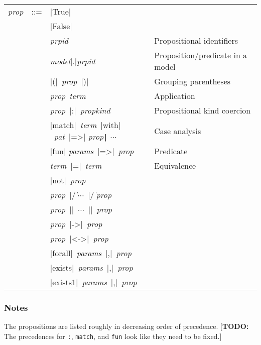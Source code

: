\documentclass[11pt]{article}
\newcommand{\metav}[1]{\mbox{\textit{#1}}}
\newcommand{\PId}{\metav{prpid}}
\newcommand{\Propexp}{\metav{prop}}
\newcommand{\Termexp}{\metav{term}}
\newcommand{\Modelexp}{\metav{model}}
\newcommand{\Propkind}{\metav{propkind}}
\newcommand{\Params}{\metav{params}}
\newcommand{\Pat}{\metav{pat}}
\newcommand{\TODO}[1]{[\textbf{TODO: }#1]}
\begin{document}
\begin{center}
	\begin{tabular}{rRlE}
	 \Propexp & ::= & |True|&\label{gr:p:true}\\
	   & \mid & |False|&\label{gr:p:false} \\
	   & \mid & \PId&Propositional identifiers\label{gr:p:id}\\
	   & \mid & \Modelexp|.|\PId&Proposition/predicate in a model\label{gr:p:mproj}\\
	   & \mid & |(|\ \Propexp\ |)|&Grouping parentheses\label{gr:p:parens}\\
	   & \mid & \Propexp\ \Termexp&Application\label{gr:p:app}\\
	   & \mid & \Propexp\ |:|\ \Propkind&Propositional kind coercion\label{gr:p:coerce}\\  
	   & \mid & |match|\ \Termexp\ |with|\ \Pat\ |=>| \Propexp \Verb+|+ $\cdots$&Case analysis\label{gr:p:match}\\
	   & \mid & |fun| \Params\ |=>|\ \Propexp&Predicate\label{gr:p:lambda}\\
	   & \mid & \Termexp\ |=|\ \Termexp&Equivalence\label{gr:p:eq}\\
	   & \mid & |not|\ \Propexp&\label{gr:p:not}\\
	   & \mid & \Propexp\ |/\|\ $\cdots$\ |/\|\ \Propexp&\label{gr:p:and}\\
	   & \mid & \Propexp\ |\/|\ $\cdots$\ |\/|\ \Propexp&\label{gr:p:or}\\
	   & \mid & \Propexp\ |->|\ \Propexp&\label{gr:p:imply}\\
	   & \mid & \Propexp\ |<->|\ \Propexp&\label{gr:p:iff}\\
	   & \mid & |forall|\ \Params\ |,|\ \Propexp&\label{gr:p:all}\\
	   & \mid & |exists|\ \Params\ |,|\ \Propexp&\label{gr:p:some}\\
	   & \mid & |exists1|\ \Params\ |,|\ \Propexp&\label{gr:p:some1}\\
	\end{tabular}
\end{center}

\subsubsection*{Notes}

The propositions are listed roughly in decreasing order of precedence.
\TODO{The precedences for \texttt{:}, \texttt{match}, and \texttt{fun} look like they need to be fixed.}
\end{document}
